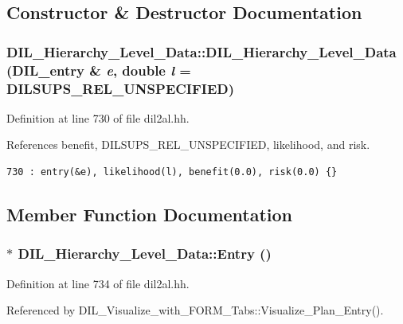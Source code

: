 \subsection{Constructor \& Destructor Documentation}
\subsubsection{\setlength{\rightskip}{0pt plus 5cm}DIL\_\-Hierarchy\_\-Level\_\-Data::DIL\_\-Hierarchy\_\-Level\_\-Data ({\bf DIL\_\-entry} \& {\em e}, double {\em l} = DILSUPS\_\-REL\_\-UNSPECIFIED)\hspace{0.3cm}{\tt  [inline]}}\label{classDIL__Hierarchy__Level__Data_a0}




Definition at line 730 of file dil2al.hh.

References benefit, DILSUPS\_\-REL\_\-UNSPECIFIED, likelihood, and risk.



\footnotesize\begin{verbatim}730 : entry(&e), likelihood(l), benefit(0.0), risk(0.0) {}
\end{verbatim}\normalsize 


\subsection{Member Function Documentation}
\subsubsection{$\ast$ DIL\_\-Hierarchy\_\-Level\_\-Data::Entry ()\hspace{0.3cm}{\tt  [inline]}}\label{classDIL__Hierarchy__Level__Data_a1}




Definition at line 734 of file dil2al.hh.

Referenced by DIL\_\-Visualize\_\-with\_\-FORM\_\-Tabs::Visualize\_\-Plan\_\-Entry().



